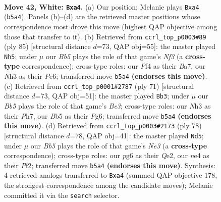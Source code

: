 \documentclass[11pt]{article}
\begin{document}
\clearpage

\begin{figure}[p]\centering
\begin{subfigure}{0.46\textwidth}\centering
\resizebox{\linewidth}{!}{%
\newchessgame
\chessboard[
  setfen={2b3k1/1q3p1p/6p1/1B2Pp2/pQ2nP2/7N/P1r3PP/1R3K2 w - - 0 42},
  showmover=false,
  pgfstyle=straightmove, color=movearrow, markmove={b5-a4}
]}
\caption{}
\end{subfigure}\hfill
\begin{subfigure}{0.46\textwidth}\centering
\resizebox{\linewidth}{!}{%
\newchessgame
\chessboard[
  setfen={6k1/b4p2/1qb1pnpp/8/4P2P/2QB1PPN/1P1N2K1/8 b - - 8 43},
  showmover=false,
  pgfstyle=straightmove, color=movearrow, markmove={f6-h5}
]}
\caption{}
\end{subfigure}
\\[4pt]
\begin{subfigure}{0.46\textwidth}\centering
\resizebox{\linewidth}{!}{%
\newchessgame
\chessboard[
  setfen={5rk1/1p5p/1q2b1p1/6b1/p2PQ1N1/P6P/1P4PB/3R3K b - - 0 36},
  showmover=false,
  pgfstyle=straightmove, color=movearrow, markmove={e6-b3}
]}
\caption{}
\end{subfigure}\hfill
\begin{subfigure}{0.46\textwidth}\centering
\resizebox{\linewidth}{!}{%
\newchessgame
\chessboard[
  setfen={r7/3n2k1/3P2pp/p5b1/1p2p2q/1P2N3/4QPBP/3R2K1 w - - 2 40},
  showmover=false,
  pgfstyle=straightmove, color=movearrow, markmove={e3-d5}
]}
\caption{}
\end{subfigure}
\caption{\textbf{Move 42, White: \texttt{Bxa4}.} (a) Our position; Melanie plays \texttt{Bxa4} (\texttt{b5a4}). Panels (b)--(d) are the retrieved master positions whose correspondence most drove this move (highest QAP objective among those that transfer to it). (b) Retrieved from \texttt{ccrl\_top\_p0003\#89} (ply 85) [structural distance $d$=73, QAP obj=55]: the master played \texttt{Nh5}; under $\mu$ our \emph{Bb5} plays the role of that game's \emph{Nf3} (a \textbf{cross-type} correspondence); cross-type roles: our \emph{P}f4 as their \emph{B}a7, our \emph{N}h3 as their \emph{P}e6; transferred move \texttt{b5a4} \textbf{(endorses this move)}. (c) Retrieved from \texttt{ccrl\_top\_p0001\#2787} (ply 71) [structural distance $d$=73, QAP obj=51]: the master played \texttt{Bb3}; under $\mu$ our \emph{Bb5} plays the role of that game's \emph{Be3}; cross-type roles: our \emph{N}h3 as their \emph{P}h7, our \emph{B}b5 as their \emph{P}g6; transferred move \texttt{b5a4} \textbf{(endorses this move)}. (d) Retrieved from \texttt{ccrl\_top\_p0003\#2173} (ply 78) [structural distance $d$=78, QAP obj=41]: the master played \texttt{Nd5}; under $\mu$ our \emph{Bb5} plays the role of that game's \emph{Ne3} (a \textbf{cross-type} correspondence); cross-type roles: our \emph{p}g6 as their \emph{Q}e2, our \emph{n}e4 as their \emph{P}f2; transferred move \texttt{b5a4} \textbf{(endorses this move)}. Synthesis: 4 retrieved analogs transferred to \texttt{Bxa4} (summed QAP objective 178, the strongest correspondence among the candidate moves); Melanie committed it via the \texttt{search} selector.}
\label{fig:thought-m82}
\end{figure}
\end{document}
